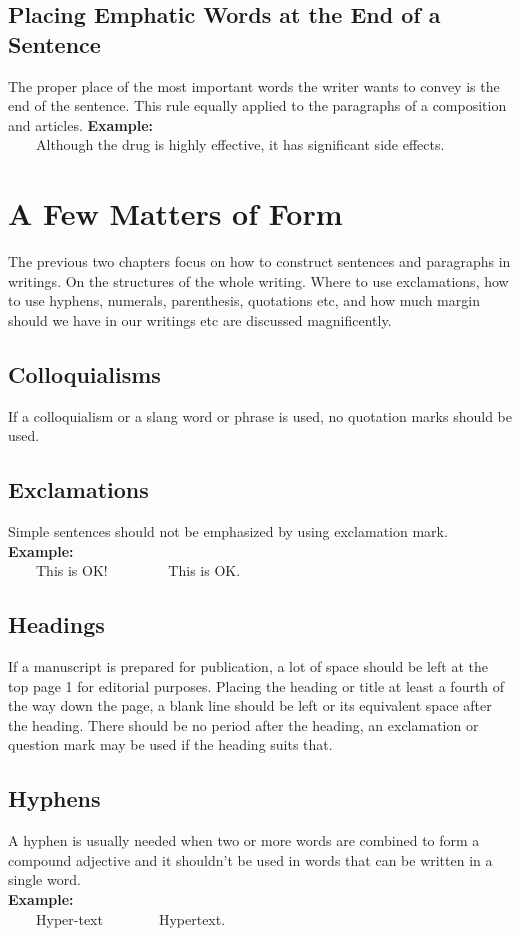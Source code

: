 \documentclass[12pt]{report}
\newcommand{\xmpl}{\textbf{Example:}\\} %
\newcommand{\indnt}{\ \ \ \ } %
\begin{document}
\section{Placing Emphatic Words at the End of a Sentence}
The proper place of the most important words the writer wants to convey is the end of the sentence. This rule equally applied to the paragraphs of a composition and articles.
\xmpl
\indnt Although the drug is highly effective, it has significant side effects.




\chapter{A Few Matters of Form}
The previous two chapters focus on how to construct sentences and paragraphs in writings. On the structures of the whole writing. Where to use exclamations, how to use hyphens, numerals, parenthesis, quotations etc, and how much margin should we have in our writings etc are discussed magnificently. 


\section{Colloquialisms}
If a colloquialism or a slang word or phrase is used, no quotation marks should be used.


\section{Exclamations}
Simple sentences should not be emphasized by using exclamation mark.\\
\xmpl
\indnt This is OK! \indnt \indnt This is OK.


\section{Headings}
If a manuscript is prepared for publication, a lot of space should be left at the top page 1 for editorial purposes. Placing the heading or title at least a fourth of the way down the page, a blank line should be left or its equivalent space after the heading. There should be no period after the heading, an exclamation or question mark may be used if the heading suits that.


\section{Hyphens}
A hyphen is usually needed when two or more words are combined to form a compound adjective and it shouldn't be used in words that can be written in a single word.\\
\xmpl
\indnt Hyper-text\indnt \indnt Hypertext.
\end{document}
